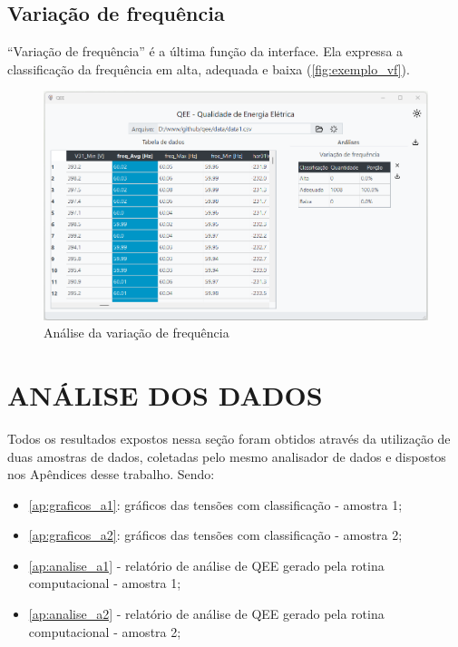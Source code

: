 \subsection{Variação de frequência}

“Variação de frequência” é a última função da interface. Ela expressa a classificação da frequência em alta, adequada e baixa (\autoref{fig:exemplo_vf}).

\begin{figure}[H]
  \centering
  \caption{Análise da variação de frequência}
  \label{fig:exemplo_vf}
  \includegraphics[width=15cm]{illustrations/figures/exemplo_vf.png}
\end{figure}

\section{ANÁLISE DOS DADOS}

Todos os resultados expostos nessa seção foram obtidos através da utilização de duas amostras de dados, coletadas pelo mesmo analisador de dados e dispostos nos Apêndices desse trabalho. Sendo:

\begin{itemize}
  \item \autoref{ap:graficos_a1}: gráficos das tensões com classificação - amostra 1;
  \item \autoref{ap:graficos_a2}: gráficos das tensões com classificação - amostra 2;
  \item \autoref{ap:analise_a1} - relatório de análise de QEE gerado pela rotina computacional -
  amostra 1;
  \item \autoref{ap:analise_a2} - relatório de análise de QEE gerado pela rotina computacional -
  amostra 2;
\end{itemize}

